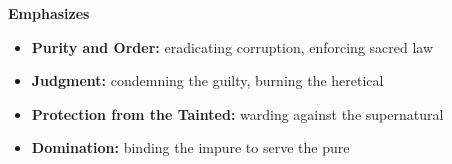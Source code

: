 \noindent\textbf{Emphasizes}
\begin{itemize}
  \item \textbf{Purity and Order:} eradicating corruption, enforcing sacred law
  \item \textbf{Judgment:} condemning the guilty, burning the heretical
  \item \textbf{Protection from the Tainted:} warding against the supernatural
  \item \textbf{Domination:} binding the impure to serve the pure
\end{itemize}